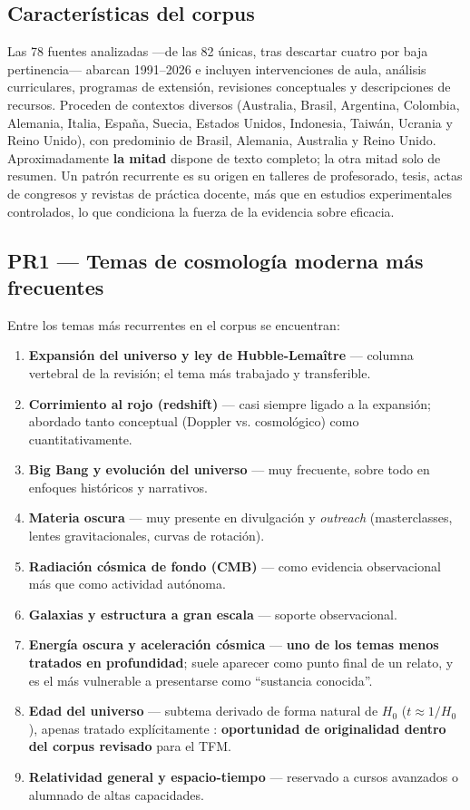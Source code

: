 \subsection{Características del corpus}

Las 78 fuentes analizadas ---de las 82 únicas, tras descartar cuatro por baja pertinencia--- abarcan 1991--2026 e incluyen intervenciones de aula, análisis curriculares, programas de extensión, revisiones conceptuales y descripciones de recursos. Proceden de contextos diversos (Australia, Brasil, Argentina, Colombia, Alemania, Italia, España, Suecia, Estados Unidos, Indonesia, Taiwán, Ucrania y Reino Unido), con predominio de Brasil, Alemania, Australia y Reino Unido. Aproximadamente \textbf{la mitad} dispone de texto completo; la otra mitad solo de resumen. Un patrón recurrente es su origen en talleres de profesorado, tesis, actas de congresos y revistas de práctica docente, más que en estudios experimentales controlados, lo que condiciona la fuerza de la evidencia sobre eficacia.

\subsection{PR1 --- Temas de cosmología moderna más frecuentes}\label{sec:pr1}

Entre los temas más recurrentes en el corpus se encuentran:

\begin{enumerate}
\item \textbf{Expansión del universo y ley de Hubble-Lemaître} --- columna vertebral de la revisión; el tema más trabajado y transferible.
\item \textbf{Corrimiento al rojo (redshift)} --- casi siempre ligado a la expansión; abordado tanto conceptual (Doppler vs. cosmológico) como cuantitativamente.
\item \textbf{Big Bang y evolución del universo} --- muy frecuente, sobre todo en enfoques históricos y narrativos.
\item \textbf{Materia oscura} --- muy presente en divulgación y \textit{outreach} (masterclasses, lentes gravitacionales, curvas de rotación).
\item \textbf{Radiación cósmica de fondo (CMB)} --- como evidencia observacional más que como actividad autónoma.
\item \textbf{Galaxias y estructura a gran escala} --- soporte observacional.
\item \textbf{Energía oscura y aceleración cósmica} --- \textbf{uno de los temas menos tratados en profundidad}; suele aparecer como punto final de un relato, y es el más vulnerable a presentarse como ``sustancia conocida''.
\item \textbf{Edad del universo} --- subtema derivado de forma natural de $H_0$ ($t \approx 1/H_0$), apenas tratado explícitamente \parencite{carmesincarmesin2014,linton2012}: \textbf{oportunidad de originalidad dentro del corpus revisado} para el TFM.
\item \textbf{Relatividad general y espacio-tiempo} --- reservado a cursos avanzados o alumnado de altas capacidades.
\end{enumerate}

